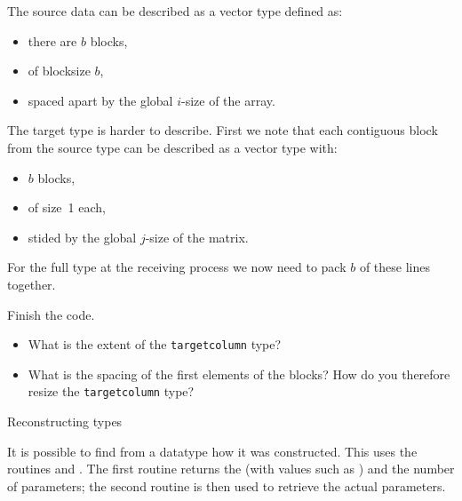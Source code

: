 The source data can be described as a vector type defined as:
\begin{itemize}
\item there are $b$ blocks,
\item of blocksize $b$,
\item spaced apart by the global $i$-size of the array.
\end{itemize}

The target type is harder to describe.
First we note that each contiguous block from the source type
can be described as a vector type with:
\begin{itemize}
\item $b$ blocks,
\item of size~1 each,
\item stided by the global $j$-size of the matrix.
\end{itemize}
%

For the full type at the receiving process we now need to pack
$b$ of these lines together.

\begin{exercise}
  Finish the code.
  \begin{itemize}
  \item
    What is the extent of the \lstinline{targetcolumn} type?
  \item What is the spacing of the first elements of the blocks? How
    do you therefore resize the \lstinline{targetcolumn} type?
  \end{itemize}
\end{exercise}


 {Reconstructing types}

It is possible to find from a datatype how it was constructed.
This uses the routines
 and
.
The first routine returns the 
(with values such as )
and the number of parameters;
the second routine is then used to retrieve the actual parameters.


